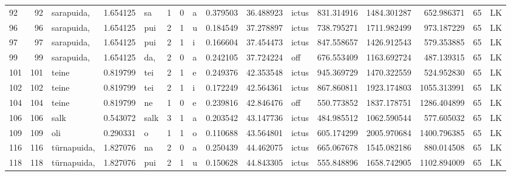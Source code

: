 \begin{tabular}{lrlrllllrrlrrrll}
92   &          92 &       sarapuida, &  1.654125 &      sa &        1 &      0 &       a &      0.379503 &     36.488923 &  ictus &   831.314916 &  1484.301287 &   652.986371 &     65 &        LK \\
96   &          96 &       sarapuida, &  1.654125 &     pui &        2 &      1 &       u &      0.184549 &     37.278897 &  ictus &   738.795271 &  1711.982499 &   973.187229 &     65 &        LK \\
97   &          97 &       sarapuida, &  1.654125 &     pui &        2 &      1 &       i &      0.166604 &     37.454473 &  ictus &   847.558657 &  1426.912543 &   579.353885 &     65 &        LK \\
99   &          99 &       sarapuida, &  1.654125 &     da, &        2 &      0 &       a &      0.242105 &     37.724224 &    off &   676.553409 &  1163.692724 &   487.139315 &     65 &        LK \\
101  &         101 &            teine &  0.819799 &     tei &        2 &      1 &       e &      0.249376 &     42.353548 &  ictus &   945.369729 &  1470.322559 &   524.952830 &     65 &        LK \\
102  &         102 &            teine &  0.819799 &     tei &        2 &      1 &       i &      0.172249 &     42.564361 &  ictus &   867.860811 &  1923.174803 &  1055.313991 &     65 &        LK \\
104  &         104 &            teine &  0.819799 &      ne &        1 &      0 &       e &      0.239816 &     42.846476 &    off &   550.773852 &  1837.178751 &  1286.404899 &     65 &        LK \\
106  &         106 &             salk &  0.543072 &    salk &        3 &      1 &       a &      0.203542 &     43.147736 &  ictus &   484.985512 &  1062.590544 &   577.605032 &     65 &        LK \\
109  &         109 &              oli &  0.290331 &       o &        1 &      1 &       o &      0.110688 &     43.564801 &  ictus &   605.174299 &  2005.970684 &  1400.796385 &     65 &        LK \\
116  &         116 &      türnapuida, &  1.827076 &      na &        2 &      0 &       a &      0.250439 &     44.462075 &  ictus &   665.067678 &  1545.082186 &   880.014508 &     65 &        LK \\
118  &         118 &      türnapuida, &  1.827076 &     pui &        2 &      1 &       u &      0.150628 &     44.843305 &  ictus &   555.848896 &  1658.742905 &  1102.894009 &     65 &        LK \\

\end{tabular}
